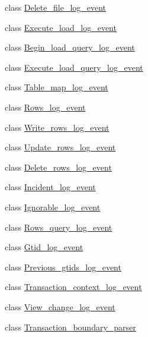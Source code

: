\begin{DoxyCompactItemize}
class \mbox{\hyperlink{classDelete__file__log__event}{Delete\+\_\+file\+\_\+log\+\_\+event}}
\item 
class \mbox{\hyperlink{classExecute__load__log__event}{Execute\+\_\+load\+\_\+log\+\_\+event}}
\item 
class \mbox{\hyperlink{classBegin__load__query__log__event}{Begin\+\_\+load\+\_\+query\+\_\+log\+\_\+event}}
\item 
class \mbox{\hyperlink{classExecute__load__query__log__event}{Execute\+\_\+load\+\_\+query\+\_\+log\+\_\+event}}
\item 
class \mbox{\hyperlink{classTable__map__log__event}{Table\+\_\+map\+\_\+log\+\_\+event}}
\item 
class \mbox{\hyperlink{classRows__log__event}{Rows\+\_\+log\+\_\+event}}
\item 
class \mbox{\hyperlink{classWrite__rows__log__event}{Write\+\_\+rows\+\_\+log\+\_\+event}}
\item 
class \mbox{\hyperlink{classUpdate__rows__log__event}{Update\+\_\+rows\+\_\+log\+\_\+event}}
\item 
class \mbox{\hyperlink{classDelete__rows__log__event}{Delete\+\_\+rows\+\_\+log\+\_\+event}}
\item 
class \mbox{\hyperlink{classIncident__log__event}{Incident\+\_\+log\+\_\+event}}
\item 
class \mbox{\hyperlink{classIgnorable__log__event}{Ignorable\+\_\+log\+\_\+event}}
\item 
class \mbox{\hyperlink{classRows__query__log__event}{Rows\+\_\+query\+\_\+log\+\_\+event}}
\item 
class \mbox{\hyperlink{classGtid__log__event}{Gtid\+\_\+log\+\_\+event}}
\item 
class \mbox{\hyperlink{classPrevious__gtids__log__event}{Previous\+\_\+gtids\+\_\+log\+\_\+event}}
\item 
class \mbox{\hyperlink{classTransaction__context__log__event}{Transaction\+\_\+context\+\_\+log\+\_\+event}}
\item 
class \mbox{\hyperlink{classView__change__log__event}{View\+\_\+change\+\_\+log\+\_\+event}}
\item 
class \mbox{\hyperlink{classTransaction__boundary__parser}{Transaction\+\_\+boundary\+\_\+parser}}
\end{DoxyCompactItemize}
